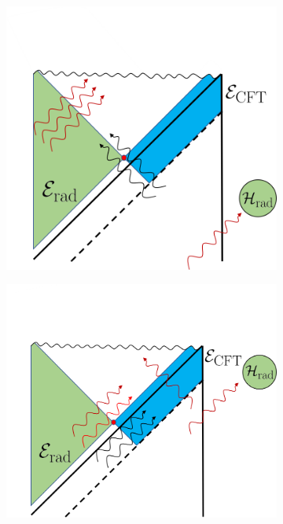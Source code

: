 \documentclass[12pt]{article}
\begin{document}
\begin{figure} [t]
\centering
\vspace{-1cm}
\begin{subfigure}{.48\textwidth}
  \centering
 \includegraphics[width = 0.8\linewidth]{ReflectedModes.png}
\end{subfigure}
\begin{subfigure}{.48\textwidth}
 \includegraphics[width = 0.87\linewidth]{ReflectedModesOutgoing.png}
 \centering


\end{subfigure}
\end{figure}
\end{document}
